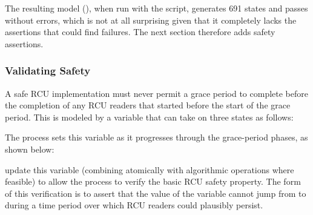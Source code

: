 The resulting model (),
when run with the
 script,
generates 691 states and
passes without errors, which is not at all surprising given that
it completely lacks the assertions that could find failures.
The next section therefore adds safety assertions.

\subsubsection{Validating Safety}
\label{sec:formal:Validating Safety}

A safe RCU implementation must never permit a grace period to
complete before the completion of any RCU readers that started
before the start of the grace period.
This is modeled by a  variable that
can take on three states as follows:



The  process sets this variable as it
progresses through the grace-period phases, as shown below:



\begin{fcvref}
update this variable (combining
atomically with algorithmic operations where feasible) to
allow the  process to verify the basic
RCU safety property.
The form of this verification is to assert that the value of the
 variable cannot jump from
 to  during a time period
over which RCU readers could plausibly persist.
\end{fcvref}

\QuickQuizEnd

